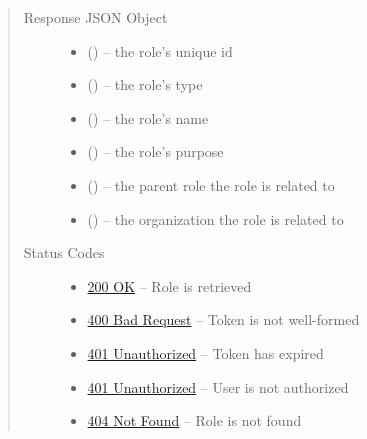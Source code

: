 \documentclass[letterpaper,10pt,english]{sphinxmanual}
\begin{document}
\begin{fulllineitems}
\begin{quote}
\begin{description}
\begin{itemize}
\end{itemize}

\item[{Response JSON Object}] \leavevmode\begin{itemize}
\item {} 
 () -- the role's unique id

\item {} 
 () -- the role's type

\item {} 
 () -- the role's name

\item {} 
 () -- the role's purpose

\item {} 
 () -- the parent role the role is related to

\item {} 
 () -- the organization the role is related to

\end{itemize}

\item[{Status Codes}] \leavevmode\begin{itemize}
\item {} 
\href{http://www.w3.org/Protocols/rfc2616/rfc2616-sec10.html\#sec10.2.1}{200 OK} -- Role is retrieved

\item {} 
\href{http://www.w3.org/Protocols/rfc2616/rfc2616-sec10.html\#sec10.4.1}{400 Bad Request} -- Token is not well-formed

\item {} 
\href{http://www.w3.org/Protocols/rfc2616/rfc2616-sec10.html\#sec10.4.2}{401 Unauthorized} -- Token has expired

\item {} 
\href{http://www.w3.org/Protocols/rfc2616/rfc2616-sec10.html\#sec10.4.2}{401 Unauthorized} -- User is not authorized

\item {} 
\href{http://www.w3.org/Protocols/rfc2616/rfc2616-sec10.html\#sec10.4.5}{404 Not Found} -- Role is not found

\end{itemize}

\end{description}\end{quote}

\end{fulllineitems}
\end{document}
